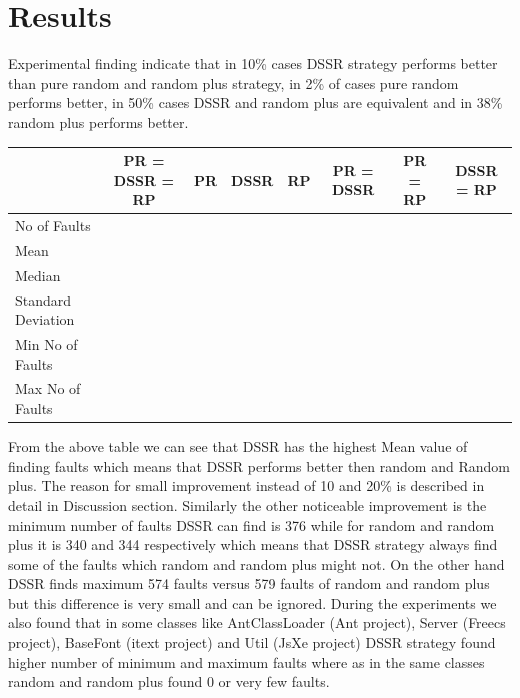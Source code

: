 \documentclass[conference]{IEEEtran}
\begin{document}

\section{Results}

Experimental finding indicate that in 10\% cases DSSR strategy performs better than pure random and random plus strategy, in 2\% of cases pure random performs better, in 50\% cases DSSR and random plus are equivalent and in 38\% random plus performs better. 



\begin{center}
\begin{table}[ht]
{\small
\hfill{}
\begin{tabular} {|l|c|c|c|c|c|c|c|}
\hline\hline
 & PR = DSSR = RP & PR & DSSR & RP & PR = DSSR & PR = RP & DSSR = RP  \\[1ex]
\hline
No of Faults &   &  &  &  & &  &   \\
Mean  &   &  &  &  & &  &   \\
Median &  &  &  &  & &  &   \\
Standard Deviation &   &  &  & &  &  & \\
Min No of Faults &   &   &  & &  &  & \\
Max No of Faults &   &  &  & &  &  & \\
\hline
\end{tabular}
}
\hfill{}
\label{tb:results}
\end{table}
\end{center}



From the above table we can see that DSSR has the highest Mean value of finding faults which means that DSSR performs better then random and Random plus. The reason for small improvement instead of 10 and 20\% is described in detail in Discussion section. Similarly the other noticeable improvement is the minimum number of faults DSSR can find is 376 while for random and random plus it is 340 and 344 respectively which means that DSSR strategy always find some of the faults which random and random plus might not. On the other hand DSSR finds maximum 574 faults versus 579 faults of random and random plus but this difference is very small and can be ignored. During the experiments we also found that in some classes like AntClassLoader (Ant project),  Server (Freecs project), BaseFont (itext project) and Util (JsXe project) DSSR strategy found higher number of minimum and maximum faults where as in the same classes random and random plus found 0 or very few faults.  \\
\end{document}
